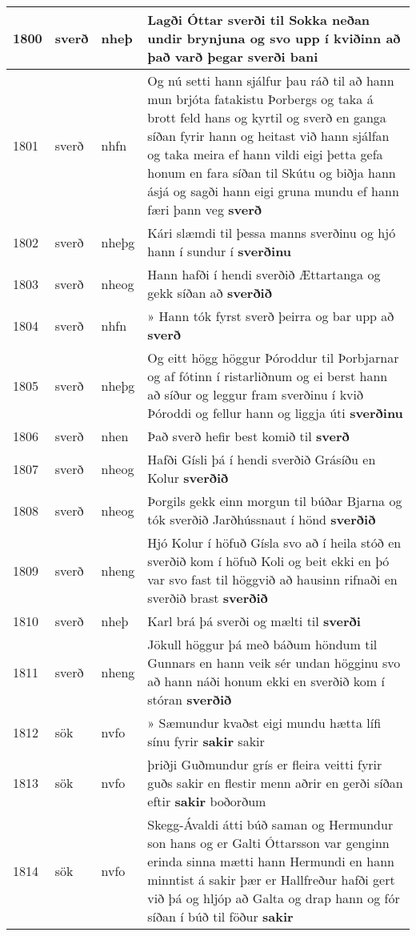 \documentclass{article}
\begin{document}
\begin{longtable}{p{1cm}|p{1cm}|p{1cm}|p{13cm}}
\hline
1800&sverð&nheþ&Lagði Óttar sverði til Sokka neðan undir brynjuna og svo upp í kviðinn að það varð þegar \textbf{sverði} bani\\
\hline
1801&sverð&nhfn&Og nú setti hann sjálfur þau ráð til að hann mun brjóta fatakistu Þorbergs og taka á brott feld hans og kyrtil og sverð en ganga síðan fyrir hann og heitast við hann sjálfan og taka meira ef hann vildi eigi þetta gefa honum en fara síðan til Skútu og biðja hann ásjá og sagði hann eigi gruna mundu ef hann færi þann veg \textbf{sverð} \\
\hline
1802&sverð&nheþg&Kári slæmdi til þessa manns sverðinu og hjó hann í sundur í \textbf{sverðinu} \\
\hline
1803&sverð&nheog&Hann hafði í hendi sverðið Ættartanga og gekk síðan að \textbf{sverðið} \\
\hline
1804&sverð&nhfn&» Hann tók fyrst sverð þeirra og bar upp að \textbf{sverð} \\
\hline
1805&sverð&nheþg&Og eitt högg höggur Þóroddur til Þorbjarnar og af fótinn í ristarliðnum og ei berst hann að síður og leggur fram sverðinu í kvið Þóroddi og fellur hann og liggja úti \textbf{sverðinu} \\
\hline
1806&sverð&nhen&Það sverð hefir best komið til \textbf{sverð} \\
\hline
1807&sverð&nheog&Hafði Gísli þá í hendi sverðið Grásíðu en Kolur \textbf{sverðið} \\
\hline
1808&sverð&nheog&Þorgils gekk einn morgun til búðar Bjarna og tók sverðið Jarðhússnaut í hönd \textbf{sverðið} \\
\hline
1809&sverð&nheng&Hjó Kolur í höfuð Gísla svo að í heila stóð en sverðið kom í höfuð Koli og beit ekki en þó var svo fast til höggvið að hausinn rifnaði en sverðið brast \textbf{sverðið} \\
\hline
1810&sverð&nheþ&Karl brá þá sverði og mælti til \textbf{sverði} \\
\hline
1811&sverð&nheng&Jökull höggur þá með báðum höndum til Gunnars en hann veik sér undan högginu svo að hann náði honum ekki en sverðið kom í stóran \textbf{sverðið} \\
\hline
1812&sök&nvfo&» Sæmundur kvaðst eigi mundu hætta lífi sínu fyrir \textbf{sakir} sakir\\
\hline
1813&sök&nvfo&þriðji Guðmundur grís er fleira veitti fyrir guðs sakir en flestir menn aðrir en gerði síðan eftir \textbf{sakir} boðorðum\\
\hline
1814&sök&nvfo&Skegg-Ávaldi átti búð saman og Hermundur son hans og er Galti Óttarsson var genginn erinda sinna mætti hann Hermundi en hann minntist á sakir þær er Hallfreður hafði gert við þá og hljóp að Galta og drap hann og fór síðan í búð til föður \textbf{sakir} \\

\end{longtable}
\end{document}
